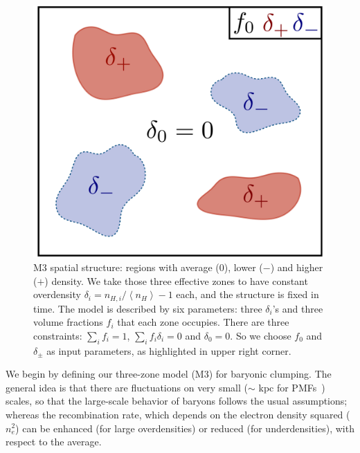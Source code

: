 \begin{figure}[ht!]
\includegraphics[width=\columnwidth]{img/3zone_model.pdf}
\caption[The spatial structure of the three-zone model: regions with average, lower and higher density]{M3 spatial structure: regions with average ($0$), lower ($-$) and higher ($+$) density.
We take those three effective zones to have constant overdensity $\delta_i=n_{H,i}/\left\langle n_H\right\rangle-1$ each, and the structure is fixed in time.
The model is described by six parameters: three $\delta_i$'s and three volume fractions $f_i$ that each zone occupies.
There are three constraints: $\sum_i f_i=1$, $\sum_i f_i \delta_i=0$ and $\delta_0=0$.
So we choose $f_0$ and $\delta_\pm$ as input parameters, as highlighted in upper right corner.
}
\label{fig:3zone_model}
\end{figure}

We begin by defining our three-zone model (M3) for baryonic clumping.
The general idea is that there are fluctuations on very small ($\sim$ kpc for PMFs~\citep{PMF-review}) scales, so that the large-scale behavior of baryons follows the usual assumptions; whereas the recombination rate, which depends on the electron density squared ($n_e^2$) can be enhanced (for large overdensities) or reduced (for underdensities), with respect to the average.

